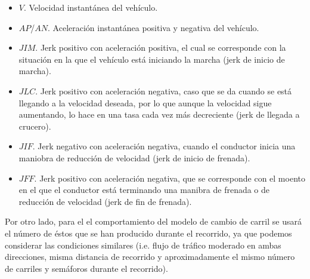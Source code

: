 \begin{itemize}
	\item $V$. Velocidad instantánea del vehículo.
	\item $AP$/$AN$. Aceleración instantánea positiva y negativa del vehículo.
	\item $JIM$. Jerk positivo con aceleración positiva, el cual se corresponde con la situación en la que el vehículo está iniciando la marcha (jerk de inicio de marcha).
	\item $JLC$. Jerk positivo con aceleración negativa, caso que se da cuando se está llegando a la velocidad deseada, por lo que aunque la velocidad sigue aumentando, lo hace en una tasa cada vez más decreciente (jerk de llegada a crucero).
	\item $JIF$. Jerk negativo con aceleración negativa, cuando el conductor inicia una maniobra de reducción de velocidad (jerk de inicio de frenada).
	\item $JFF$. Jerk positivo con aceleración negativa, que se corresponde con el moento en el que el conductor está terminando una manibra de frenada o de reducción de velocidad (jerk de fin de frenada).
\end{itemize}

Por otro lado, para el el comportamiento del modelo de cambio de carril se usará el número de éstos que se han producido durante el recorrido, ya que podemos considerar las condiciones similares (i.e. flujo de tráfico moderado en ambas direcciones, misma distancia de recorrido y aproximadamente el mismo número de carriles y semáforos durante el recorrido).

